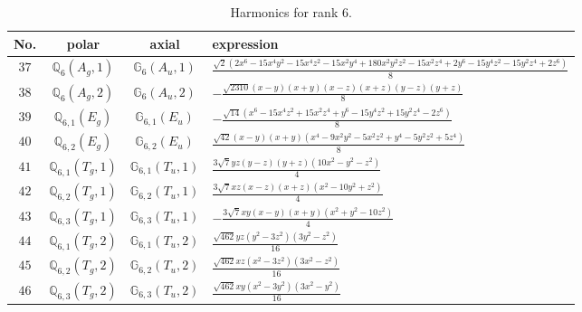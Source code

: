 \documentclass[fleqn,8pt,landscape]{jsarticle}
\begin{document}
\begin{table}[ht!]
\begin{center}
\caption{Harmonics for rank 6.}
\renewcommand{\arraystretch}{1.3}
\begin{tabular}{cccl} \hline \hline
No. & polar & axial & expression \\ \hline
$ 37 $ & $ \mathbb{Q}_{6}(A_{g},1) $ & $ \mathbb{G}_{6}(A_{u},1) $ & $ \frac{\sqrt{2} \left(2 x^{6} - 15 x^{4} y^{2} - 15 x^{4} z^{2} - 15 x^{2} y^{4} + 180 x^{2} y^{2} z^{2} - 15 x^{2} z^{4} + 2 y^{6} - 15 y^{4} z^{2} - 15 y^{2} z^{4} + 2 z^{6}\right)}{8} $ \\
$ 38 $ & $ \mathbb{Q}_{6}(A_{g},2) $ & $ \mathbb{G}_{6}(A_{u},2) $ & $ - \frac{\sqrt{2310} \left(x - y\right) \left(x + y\right) \left(x - z\right) \left(x + z\right) \left(y - z\right) \left(y + z\right)}{8} $ \\
$ 39 $ & $ \mathbb{Q}_{6,1}(E_{g}) $ & $ \mathbb{G}_{6,1}(E_{u}) $ & $ - \frac{\sqrt{14} \left(x^{6} - 15 x^{4} z^{2} + 15 x^{2} z^{4} + y^{6} - 15 y^{4} z^{2} + 15 y^{2} z^{4} - 2 z^{6}\right)}{8} $ \\
$ 40 $ & $ \mathbb{Q}_{6,2}(E_{g}) $ & $ \mathbb{G}_{6,2}(E_{u}) $ & $ \frac{\sqrt{42} \left(x - y\right) \left(x + y\right) \left(x^{4} - 9 x^{2} y^{2} - 5 x^{2} z^{2} + y^{4} - 5 y^{2} z^{2} + 5 z^{4}\right)}{8} $ \\
$ 41 $ & $ \mathbb{Q}_{6,1}(T_{g},1) $ & $ \mathbb{G}_{6,1}(T_{u},1) $ & $ \frac{3 \sqrt{7} y z \left(y - z\right) \left(y + z\right) \left(10 x^{2} - y^{2} - z^{2}\right)}{4} $ \\
$ 42 $ & $ \mathbb{Q}_{6,2}(T_{g},1) $ & $ \mathbb{G}_{6,2}(T_{u},1) $ & $ \frac{3 \sqrt{7} x z \left(x - z\right) \left(x + z\right) \left(x^{2} - 10 y^{2} + z^{2}\right)}{4} $ \\
$ 43 $ & $ \mathbb{Q}_{6,3}(T_{g},1) $ & $ \mathbb{G}_{6,3}(T_{u},1) $ & $ - \frac{3 \sqrt{7} x y \left(x - y\right) \left(x + y\right) \left(x^{2} + y^{2} - 10 z^{2}\right)}{4} $ \\
$ 44 $ & $ \mathbb{Q}_{6,1}(T_{g},2) $ & $ \mathbb{G}_{6,1}(T_{u},2) $ & $ \frac{\sqrt{462} y z \left(y^{2} - 3 z^{2}\right) \left(3 y^{2} - z^{2}\right)}{16} $ \\
$ 45 $ & $ \mathbb{Q}_{6,2}(T_{g},2) $ & $ \mathbb{G}_{6,2}(T_{u},2) $ & $ \frac{\sqrt{462} x z \left(x^{2} - 3 z^{2}\right) \left(3 x^{2} - z^{2}\right)}{16} $ \\
$ 46 $ & $ \mathbb{Q}_{6,3}(T_{g},2) $ & $ \mathbb{G}_{6,3}(T_{u},2) $ & $ \frac{\sqrt{462} x y \left(x^{2} - 3 y^{2}\right) \left(3 x^{2} - y^{2}\right)}{16} $ \\

\end{tabular}
\end{center}
\end{table}
\end{document}
